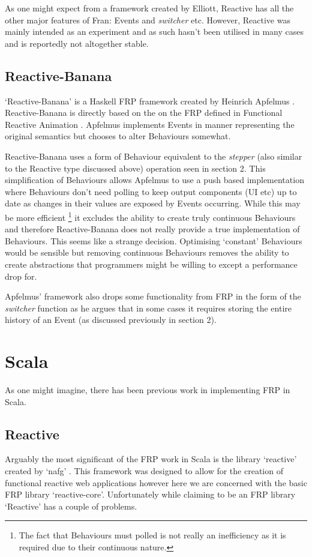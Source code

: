       As one might expect from a framework created by Elliott, Reactive has all the other major features
      of Fran: Events and \emph{switcher} etc. However, Reactive was mainly intended as an experiment
      and as such hasn't been utilised in many cases and is reportedly not altogether stable.
  
    \subsection{Reactive-Banana}
      `Reactive-Banana' is a Haskell FRP framework created by Heinrich Apfelmus \cite{Apfelmus}. Reactive-Banana
      is directly based on the on the FRP defined in Functional Reactive Animation \cite{Elliott1997}. Apfelmus
      implements Events in manner representing the original semantics but chooses to alter
      Behaviours somewhat. 
      
      Reactive-Banana uses a form of Behaviour equivalent to the \emph{stepper}
      (also similar to the Reactive type discussed above) operation seen in section 2. This simplification of Behaviours allows 
      Apfelmus to use a push
      based implementation where Behaviours don't need polling to keep output components (UI etc) up to date as changes in their values are exposed
      by Events occurring. While this may be more efficient \footnote{The fact that Behaviours must polled is not really an inefficiency as it is required due to their continuous nature. } it excludes the ability to create truly 
      continuous Behaviours and therefore Reactive-Banana does not really provide a true implementation
      of Behaviours. This seems like a strange decision. Optimising `constant' Behaviours would be sensible
      but removing continuous Behaviours removes the ability to create abstractions that programmers
      might be willing to except a performance drop for.
      
      Apfelmus' framework also drops some functionality from FRP in the form of the \emph{switcher} function as
      he argues that in some cases it requires storing the entire history of an Event (as discussed previously
      in section 2).

  \section{Scala}
    As one might imagine, there has been previous work in implementing FRP in Scala. 

    \subsection{Reactive}
      Arguably the most significant of the FRP work in Scala is the library `reactive' created by `nafg' \cite{Nafg}. This    
      framework was designed to allow for the creation of functional reactive web applications however here we are concerned 
      with the basic FRP library `reactive-core'. Unfortunately while claiming to be an FRP library `Reactive'
      has a couple of problems.

